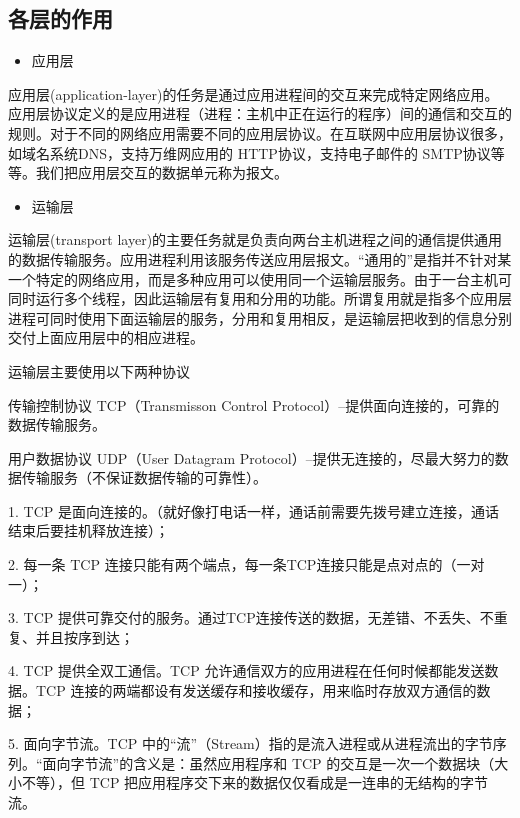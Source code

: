 \subsection{各层的作用}

\begin{itemize}
    \item[1.] 应用层
\end{itemize}

应用层(application-layer)的任务是通过应用进程间的交互来完成特定网络应用。应用层协议定义的是应用进程（进程：主机中正在运行的程序）间的通信和交互的规则。对于不同的网络应用需要不同的应用层协议。在互联网中应用层协议很多，如域名系统DNS，支持万维网应用的 HTTP协议，支持电子邮件的 SMTP协议等等。我们把应用层交互的数据单元称为报文。

\begin{itemize}
    \item[2.] 运输层
\end{itemize}

运输层(transport layer)的主要任务就是负责向两台主机进程之间的通信提供通用的数据传输服务。应用进程利用该服务传送应用层报文。“通用的”是指并不针对某一个特定的网络应用，而是多种应用可以使用同一个运输层服务。由于一台主机可同时运行多个线程，因此运输层有复用和分用的功能。所谓复用就是指多个应用层进程可同时使用下面运输层的服务，分用和复用相反，是运输层把收到的信息分别交付上面应用层中的相应进程。

运输层主要使用以下两种协议

传输控制协议 TCP（Transmisson Control Protocol）--提供面向连接的，可靠的数据传输服务。

用户数据协议 UDP（User Datagram Protocol）--提供无连接的，尽最大努力的数据传输服务（不保证数据传输的可靠性）。

\begin{framed}

1. TCP 是面向连接的。（就好像打电话一样，通话前需要先拨号建立连接，通话结束后要挂机释放连接）；

2. 每一条 TCP 连接只能有两个端点，每一条TCP连接只能是点对点的（一对一）；

3. TCP 提供可靠交付的服务。通过TCP连接传送的数据，无差错、不丢失、不重复、并且按序到达；

4. TCP 提供全双工通信。TCP 允许通信双方的应用进程在任何时候都能发送数据。TCP 连接的两端都设有发送缓存和接收缓存，用来临时存放双方通信的数据；

5. 面向字节流。TCP 中的“流”（Stream）指的是流入进程或从进程流出的字节序列。“面向字节流”的含义是：虽然应用程序和 TCP 的交互是一次一个数据块（大小不等），但 TCP 把应用程序交下来的数据仅仅看成是一连串的无结构的字节流。
\end{framed}

